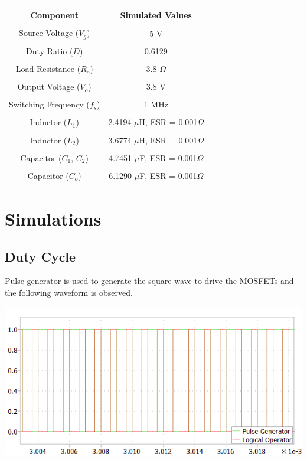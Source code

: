 \documentclass[12pt]{article}
\begin{document}
\begin{table}[h]
\centering
\begin{tabular}{| c | c |}
\hline
&\\[-2ex]
\textbf{Component} & \textbf{Simulated Values}\\[0.5ex]
\hline
&\\[-2ex]
Source Voltage ($V_g$) & 5 V\\[0.5ex]
\hline
&\\[-2ex]
Duty Ratio ($D$) & 0.6129\\[0.5ex]
\hline
&\\[-2ex]
Load Resistance ($R_o$) & 3.8 $\Omega$\\[0.5ex]
\hline
&\\[-2ex]
Output Voltage ($V_o$) & 3.8 V\\[0.5ex]
\hline
&\\[-2ex]
Switching Frequency ($f_s$) & 1 MHz\\[0.5ex]
\hline
&\\[-2ex]
Inductor ($L_1$) & 2.4194 $\mu$H, ESR = 0.001$\Omega$\\[0.5ex]
\hline
&\\[-2ex]
Inductor ($L_2$) & 3.6774 $\mu$H, ESR = 0.001$\Omega$\\[0.5ex]
\hline
&\\[-2ex]
Capacitor ($C_1$, $C_2$) & 4.7451 $\mu$F, ESR = 0.001$\Omega$\\[0.5ex]
\hline
&\\[-2ex]
Capacitor ($C_o$) & 6.1290 $\mu$F, ESR = 0.001$\Omega$\\[0.5ex]
\hline
\end{tabular}
\end{table}


\section{Simulations}
\subsection{Duty Cycle}
Pulse generator is used to generate the square wave to drive the MOSFETs and the following waveform is observed.

\begin{center}
\includegraphics[scale=0.8]{images/duty_graph.png}
\end{center}
\end{document}
